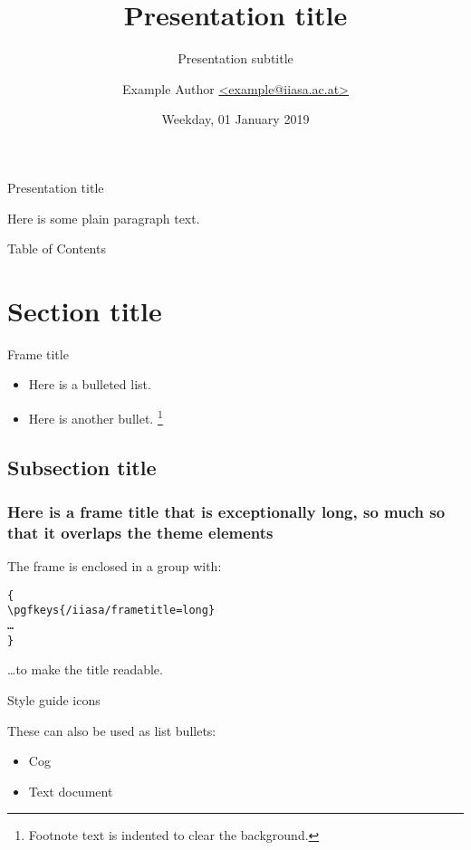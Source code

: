 \documentclass[aspectratio=169]{beamer}
\title{Presentation title}
\subtitle{Presentation subtitle}
\author{Example Author
  \href{mailto:example@iiasa.ac.at}%
  {\ttfamily <example@iiasa.ac.at>}}
\date{Weekday, 01 January 2019}
\institute{Venue for presentation}
\begin{document}
\maketitle

\begin{frame}{Presentation title}

  Here is some plain paragraph text.

\end{frame}

\begin{frame}{Table of Contents}

  \tableofcontents

\end{frame}

\section{Section title}

\begin{frame}{Frame title}

  \begin{itemize}
    \item Here is a bulleted list.
    \item Here is another bullet.
      \footnote{Footnote text is indented to clear the background.}
  \end{itemize}

\end{frame}

\subsection{Subsection title}

{
\begin{frame}[fragile]

\frametitle{Here is a frame title that is exceptionally long, so much so that it overlaps the theme elements}

The frame is enclosed in a group with:
\begin{verbatim}
{
\pgfkeys{/iiasa/frametitle=long}
…
}
\end{verbatim}
…to make the title readable.

\end{frame}
}

\begin{frame}{Style guide icons}


  These can also be used as list bullets:

  \begin{itemize}
    \item [\iiasaicon{cog}] Cog
    \item [\iiasaicon{doc-text}] Text document
  \end{itemize}

\end{frame}
\end{document}
